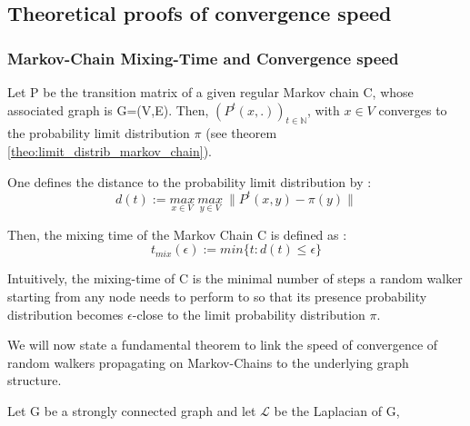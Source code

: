 
\subsection{Theoretical proofs of convergence speed}
\subsubsection{Markov-Chain Mixing-Time and Convergence speed}
\label{section:theoretical_proofs_of_convergence}
\begin{definition}
Let P be the transition matrix of a given regular Markov chain C, whose associated graph is G=(V,E). Then, $(P^t(x, .))_{t\in \mathbb{N}}$, with $x \in V$ converges to the probability limit distribution $\pi$ (see theorem \ref{theo:limit_distrib_markov_chain}).

One defines the distance to the probability limit distribution by :
\begin{equation}
    d(t) := \underset{x \in V}{max} \ \underset{y \in V}{max} \ \| P^t(x, y) - \pi(y) \|
\end{equation}

Then, the mixing time of the Markov Chain C is defined as : 
\begin{equation}
    t_{mix}(\epsilon) := min\{t : d(t) \leq \epsilon \}
\end{equation}

\end{definition}

Intuitively, the mixing-time of C is the minimal number of steps a random walker starting from any node needs to perform to so that its presence probability distribution becomes $\epsilon$-close to the limit probability distribution $\pi$.

We will now state a fundamental theorem to link the speed of convergence of random walkers propagating on Markov-Chains to the underlying graph structure.

\begin{theo}
Let G be a strongly connected graph and let $\mathcal{L}$ be the Laplacian of G,

\end{theo}